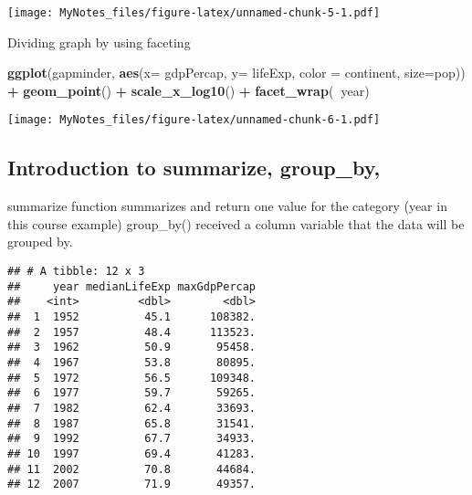 \documentclass[]{article}
\newenvironment{Shaded}{\begin{snugshade}}{\end{snugshade}}
\newcommand{\KeywordTok}[1]{\textcolor[rgb]{0.13,0.29,0.53}{\textbf{#1}}}
\newcommand{\DataTypeTok}[1]{\textcolor[rgb]{0.13,0.29,0.53}{#1}}
\newcommand{\StringTok}[1]{\textcolor[rgb]{0.31,0.60,0.02}{#1}}
\newcommand{\CommentTok}[1]{\textcolor[rgb]{0.56,0.35,0.01}{\textit{#1}}}
\newcommand{\OperatorTok}[1]{\textcolor[rgb]{0.81,0.36,0.00}{\textbf{#1}}}
\newcommand{\NormalTok}[1]{#1}
\begin{document}
\texttt{[image: MyNotes\_files/figure-latex/unnamed-chunk-5-1.pdf]}

Dividing graph by using faceting

\begin{Shaded}
\begin{Highlighting}[]
\KeywordTok{ggplot}\NormalTok{(gapminder, }\KeywordTok{aes}\NormalTok{(}\DataTypeTok{x=}\NormalTok{ gdpPercap, }\DataTypeTok{y=}\NormalTok{ lifeExp, }\DataTypeTok{color =}\NormalTok{ continent, }\DataTypeTok{size=}\NormalTok{pop)) }\OperatorTok{+}\StringTok{ }\KeywordTok{geom_point}\NormalTok{() }\OperatorTok{+}\StringTok{ }\KeywordTok{scale_x_log10}\NormalTok{() }\OperatorTok{+}\StringTok{ }\KeywordTok{facet_wrap}\NormalTok{(}\OperatorTok{~}\NormalTok{year)}
\end{Highlighting}
\end{Shaded}

\texttt{[image: MyNotes\_files/figure-latex/unnamed-chunk-6-1.pdf]}

\subsection{Introduction to summarize,
group\_by,}\label{introduction-to-summarize-group_by}

summarize function summarizes and return one value for the category
(year in this course example) group\_by() received a column variable
that the data will be grouped by.

\begin{Shaded}
\end{Shaded}

\begin{verbatim}
## # A tibble: 12 x 3
##     year medianLifeExp maxGdpPercap
##    <int>         <dbl>        <dbl>
##  1  1952          45.1      108382.
##  2  1957          48.4      113523.
##  3  1962          50.9       95458.
##  4  1967          53.8       80895.
##  5  1972          56.5      109348.
##  6  1977          59.7       59265.
##  7  1982          62.4       33693.
##  8  1987          65.8       31541.
##  9  1992          67.7       34933.
## 10  1997          69.4       41283.
## 11  2002          70.8       44684.
## 12  2007          71.9       49357.
\end{verbatim}
\end{document}

